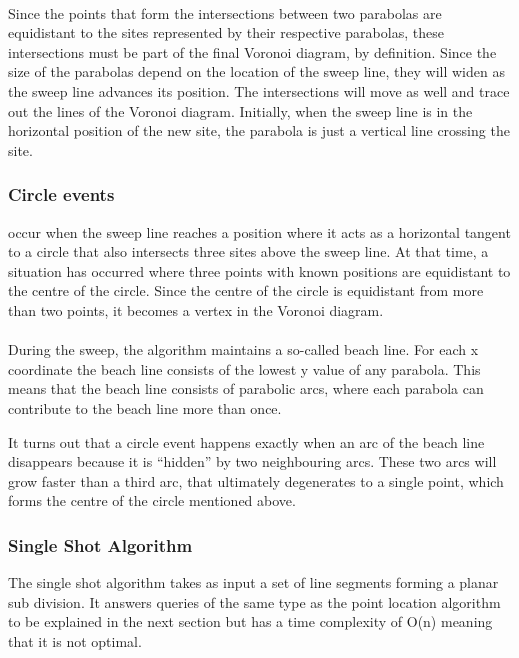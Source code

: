 \paragraph{}
Since the points that form the intersections between two parabolas are equidistant to the sites represented by their respective parabolas, these intersections must be part of the final Voronoi diagram, by definition. Since the size of the parabolas depend on the location of the sweep line, they will widen as the sweep line advances its position. The intersections will move as well and trace out the lines of the Voronoi diagram. Initially, when the sweep line is in the horizontal position of the new site, the parabola is just a vertical line crossing the site.

\subsubsection{Circle events}
occur when the sweep line reaches a position where it acts as a horizontal tangent to a circle that also intersects three sites above the sweep line. At that time, a situation has occurred where three points with known positions are equidistant to the centre of the circle. Since the centre of the circle is equidistant from more than two points, it becomes a vertex in the Voronoi diagram.

\paragraph{}
During the sweep, the algorithm maintains a so-called beach line. For each x coordinate the beach line consists of the lowest y value of any parabola. This means that the beach line consists of parabolic arcs, where each parabola can contribute to the beach line more than once.

It turns out that a circle event happens exactly when an arc of the beach line disappears because it is “hidden” by two neighbouring arcs. These two arcs will grow faster than a third arc, that ultimately degenerates to a single point, which forms the centre of the circle mentioned above.

\subsubsection{Single Shot Algorithm}
The single shot algorithm takes as input a set of line segments forming a planar sub division. It answers queries of the same type as the point location algorithm to be explained in the next section but has a time complexity of O(n) meaning that it is not optimal. 

